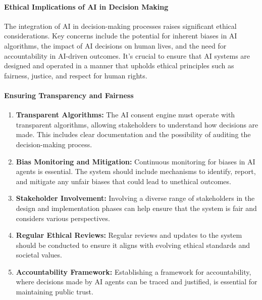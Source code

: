 \documentclass{article}
\begin{document}
\hypertarget{ethical-implications-of-ai-in-decision-making}{%
\paragraph{Ethical Implications of AI in Decision
Making}\label{ethical-implications-of-ai-in-decision-making}}

The integration of AI in decision-making processes raises significant
ethical considerations. Key concerns include the potential for inherent
biases in AI algorithms, the impact of AI decisions on human lives, and
the need for accountability in AI-driven outcomes. It's crucial to
ensure that AI systems are designed and operated in a manner that
upholds ethical principles such as fairness, justice, and respect for
human rights.

\hypertarget{ensuring-transparency-and-fairness}{%
\paragraph{Ensuring Transparency and
Fairness}\label{ensuring-transparency-and-fairness}}

\begin{enumerate}
\def\labelenumi{\arabic{enumi}.}
\item
  \textbf{Transparent Algorithms:} The AI consent engine must operate
  with transparent algorithms, allowing stakeholders to understand how
  decisions are made. This includes clear documentation and the
  possibility of auditing the decision-making process.
\item
  \textbf{Bias Monitoring and Mitigation:} Continuous monitoring for
  biases in AI agents is essential. The system should include mechanisms
  to identify, report, and mitigate any unfair biases that could lead to
  unethical outcomes.
\item
  \textbf{Stakeholder Involvement:} Involving a diverse range of
  stakeholders in the design and implementation phases can help ensure
  that the system is fair and considers various perspectives.
\item
  \textbf{Regular Ethical Reviews:} Regular reviews and updates to the
  system should be conducted to ensure it aligns with evolving ethical
  standards and societal values.
\item
  \textbf{Accountability Framework:} Establishing a framework for
  accountability, where decisions made by AI agents can be traced and
  justified, is essential for maintaining public trust.
\end{enumerate}
\end{document}
